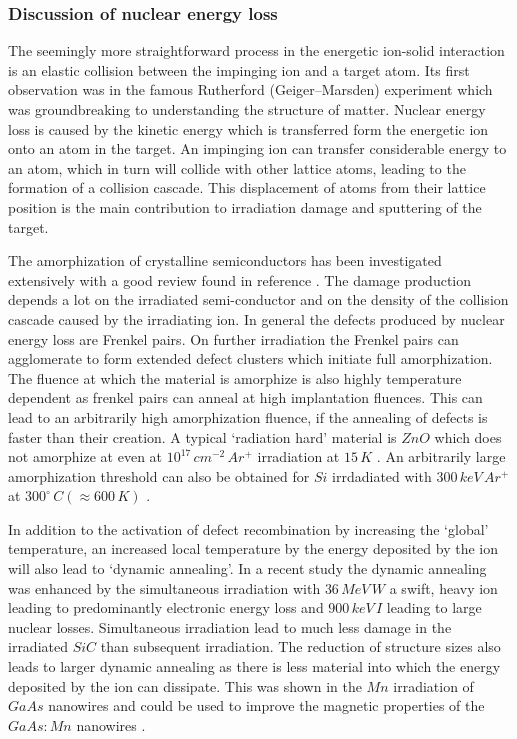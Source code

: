 \subsubsection{Discussion of nuclear energy loss}

The seemingly more straightforward process in the energetic ion-solid interaction is an elastic collision between the impinging ion and a target atom. Its first observation was in the famous Rutherford (Geiger–Marsden) experiment \cite{rutherford_scattering_1911} which was groundbreaking to understanding the structure of matter. Nuclear energy loss is caused by the kinetic energy which is transferred form the energetic ion onto an atom in the target. An impinging ion can transfer considerable energy to an atom, which in turn will collide with other lattice atoms, leading to the formation of a collision cascade. This displacement of atoms from their lattice position is the main contribution to irradiation damage and sputtering of the target.

The amorphization of crystalline semiconductors has been investigated extensively with a good review found in reference \cite{wesch_damage_2012}. The damage production depends a lot on the irradiated semi-conductor and on the density of the collision cascade caused by the irradiating ion. In general the defects produced by nuclear energy loss are Frenkel pairs. On further irradiation the Frenkel pairs can agglomerate to form extended defect clusters which initiate full amorphization. The fluence at which the material is amorphize is also highly temperature dependent as frenkel pairs can anneal at high implantation fluences. This can lead to an arbitrarily high amorphization fluence, if the annealing of defects is faster than their creation. A typical `radiation hard' material is $ZnO$ which does not amorphize at even at $10^{17}\,cm^{-2}\,Ar^+$ irradiation at $15\,K$ \cite{wesch_damage_2012}. An arbitrarily large amorphization threshold can also be obtained for $Si$ irrdadiated with $300\,keV\,Ar^+$ at $300^\circ\,C (\approx 600\,K)$ \cite{pelaz_ion-beam-induced_2004}.

In addition to the activation of defect recombination by increasing the `global' temperature, an increased local temperature by the energy deposited by the ion will also lead to `dynamic annealing'. In a recent study \cite{thome_recovery_2015} the dynamic annealing was enhanced by the simultaneous irradiation with $36\,MeV\,W$ a swift, heavy ion leading to predominantly electronic energy loss and $900\,keV\,I$ leading to large nuclear losses. Simultaneous irradiation lead to much less damage in the irradiated $SiC$ than subsequent irradiation. The reduction of structure sizes also leads to larger dynamic annealing as there is less material into which the energy deposited by the ion can dissipate. This was shown in the $Mn$ irradiation of $GaAs$ nanowires \cite{borschel_ion-solid_2012,johannes_ion_2015} and could be used to improve the magnetic properties of the $GaAs:Mn$ nanowires \cite{borschel_new_2011,paschoal_hopping_2012,kumar_magnetic_2013,paschoal_magnetoresistance_2014}. 


